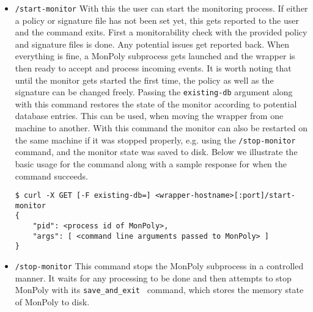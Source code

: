 \begin{itemize}
    \item \texttt{/start-monitor}
    With this the user can start the monitoring process.
    If either a policy or signature file has not been set yet, this gets reported to the user and the command exits.
    First a monitorability check with the provided policy and signature files is done.
    Any potential issues get reported back.
    When everything is fine, a MonPoly subprocess gets launched and the wrapper is then ready to accept and process incoming events.
    It is worth noting that until the monitor gets started the first time, the policy as well as the signature can be changed freely.
    Passing the \texttt{existing-db} argument along with this command restores the state of the monitor according to potential database entries.
    This can be used, when moving the wrapper from one machine to another.
    With this command the monitor can also be restarted on the same machine if it was stopped properly, e.g. using the \texttt{/stop-monitor} command, and the monitor state was saved to disk.
    Below we illustrate the basic usage for the command along with a sample response for when the command succeeds.
    \begin{verbatim}
$ curl -X GET [-F existing-db=] <wrapper-hostname>[:port]/start-monitor 
{
    "pid": <process id of MonPoly>,
    "args": [ <command line arguments passed to MonPoly> ]
}
    \end{verbatim}

    \item \texttt{/stop-monitor}
    This command stops the MonPoly subprocess in a controlled manner.
    It waits for any processing to be done and then attempts to stop MonPoly with its \texttt{save\_and\_exit } command, which stores the memory state of MonPoly to disk.



\end{itemize}
